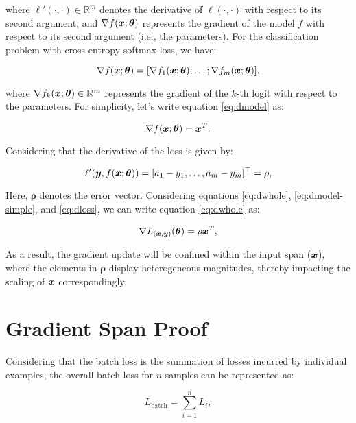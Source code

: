 \documentclass{article}
\begin{document}
where $\ell'(\cdot,\cdot) \in \mathbb{R}^m$ denotes the derivative of $\ell(\cdot,\cdot)$ with respect to its second argument, and $\nabla f({\bm{x}};{\bm{\theta}})$ represents the gradient of the model $f$ with respect to its second argument (i.e., the parameters). For the classification problem with cross-entropy softmax loss, we have:

\begin{equation}
\nabla f({\bm{x}};{\bm{\theta}}) = [\nabla f_1({\bm{x}};{\bm{\theta}}); \ldots; \nabla f_m({\bm{x}};{\bm{\theta}})],\label{eq:dmodel}
\end{equation}

where $\nabla f_k({\bm{x}};{\bm{\theta}}) \in \mathbb{R}^{m}$ represents the gradient of the $k$-th logit with respect to the parameters. For simplicity, let's write equation \ref{eq:dmodel} as:

\begin{equation}
\nabla f({\bm{x}};{\bm{\theta}}) = {\bm{x}}^T.\label{eq:dmodel-simple}
\end{equation}

Considering that the derivative of the loss is given by:

\begin{equation}
\ell'({\bm{y}}, f({\bm{x}};{\bm{\theta}})) = [a_1-y_1, \ldots, a_m-y_m]^{\top}=\rho, \label{eq:dloss}
\end{equation}

Here, $\bm{\rho}$ denotes the error vector. Considering equations \ref{eq:dwhole}, \ref{eq:dmodel-simple}, and \ref{eq:dloss}, we can write equation \ref{eq:dwhole} as:

\begin{equation}
\nabla L_{({\bm{x}},{\bm{y}})}({\bm{\theta}}) =\rho {\bm{x}}^T,\label{eq:dfinal}
\end{equation}

As a result, the gradient update will be confined within the input span (${\bm{x}}$), where the elements in $\bm{\rho}$ display heterogeneous magnitudes, thereby impacting the scaling of ${\bm{x}}$ correspondingly.

\section{Gradient Span Proof}
\label{app:span}
Considering that the batch loss is the summation of losses incurred by individual examples, the overall batch loss for $n$ samples can be represented as:

\begin{equation}\label{eqa1p}
L_{\text{batch}} = \sum_{i=1}^{n} L_i,
\end{equation}
\end{document}
